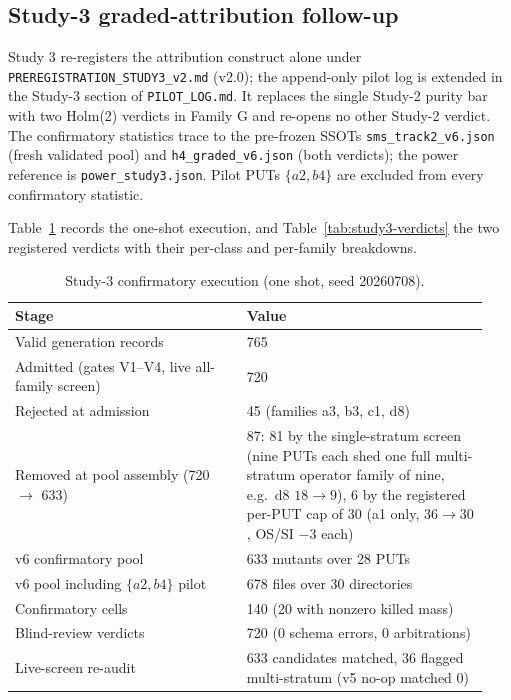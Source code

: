 \documentclass[manuscript,screen,review]{acmart}
\begin{document}
\subsection{Study-3 graded-attribution follow-up}\label{j.6-study3-detail}

Study 3 re-registers the attribution construct alone under
\texttt{PREREGISTRATION\_STUDY3\_v2.md} (v2.0); the append-only pilot log is
extended in the Study-3 section of \texttt{PILOT\_LOG.md}. It replaces the
single Study-2 purity bar with two Holm(2) verdicts in Family G and re-opens no
other Study-2 verdict. The confirmatory statistics trace to the pre-frozen SSOTs
\texttt{sms\_track2\_v6.json} (fresh validated pool) and
\texttt{h4\_graded\_v6.json} (both verdicts); the power reference is
\texttt{power\_study3.json}. Pilot PUTs \(\{a2, b4\}\) are excluded from every
confirmatory statistic.

Table~\ref{tab:study3-exec} records the one-shot execution, and
Table~\ref{tab:study3-verdicts} the two registered verdicts with their per-class
and per-family breakdowns.

{%
\small
\begin{longtable}[]{@{}p{0.46\linewidth}p{0.48\linewidth}@{}}
\caption{Study-3 confirmatory execution (one shot, seed 20260708).}\label{tab:study3-exec}\\
\toprule\noalign{}
Stage & Value \\
\midrule\noalign{}
\endfirsthead
\endhead
\bottomrule\noalign{}
\endlastfoot
Valid generation records & 765 \\
Admitted (gates V1--V4, live all-family screen) & 720 \\
Rejected at admission & 45 (families a3, b3, c1, d8) \\
Removed at pool assembly (720 \(\to\) 633) & 87: 81 by the single-stratum screen
(nine PUTs each shed one full multi-stratum operator family of nine, e.g.\ d8
\(18 \to 9\)), 6 by the registered per-PUT cap of 30 (a1 only, \(36 \to 30\),
OS/SI \(-3\) each) \\
v6 confirmatory pool & 633 mutants over 28 PUTs \\
v6 pool including \(\{a2, b4\}\) pilot & 678 files over 30 directories \\
Confirmatory cells & 140 (20 with nonzero killed mass) \\
Blind-review verdicts & 720 (0 schema errors, 0 arbitrations) \\
Live-screen re-audit & 633 candidates matched, 36 flagged multi-stratum
(v5 no-op matched 0) \\
\end{longtable}
\normalsize
}
\end{document}

